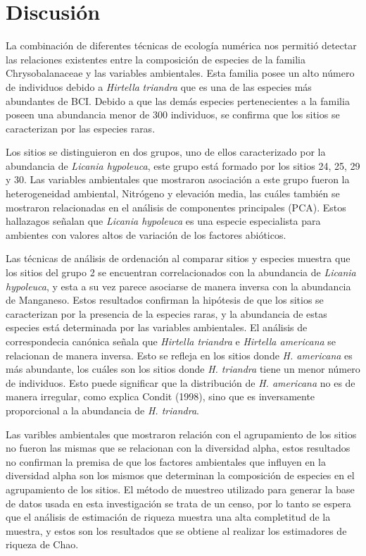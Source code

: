 \documentclass[11pt,]{article}
\begin{document}
\section{Discusión}\label{discusiuxf3n}

La combinación de diferentes técnicas de ecología numérica nos permitió
detectar las relaciones existentes entre la composición de especies de
la familia Chrysobalanaceae y las variables ambientales. Esta familia
posee un alto número de individuos debido a \emph{Hirtella}
\emph{triandra} que es una de las especies más abundantes de BCI. Debido
a que las demás especies pertenecientes a la familia poseen una
abundancia menor de 300 individuos, se confirma que los sitios se
caracterizan por las especies raras.

Los sitios se distinguieron en dos grupos, uno de ellos caracterizado
por la abundancia de \emph{Licania hypoleuca}, este grupo está formado
por los sitios 24, 25, 29 y 30. Las variables ambientales que mostraron
asociación a este grupo fueron la heterogeneidad ambiental, Nitrógeno y
elevación media, las cuáles también se mostraron relacionadas en el
análisis de componentes principales (PCA). Estos hallazagos señalan que
\emph{Licania hypoleuca} es una especie especialista para ambientes con
valores altos de variación de los factores abióticos.

Las técnicas de análisis de ordenación al comparar sitios y especies
muestra que los sitios del grupo 2 se encuentran correlacionados con la
abundancia de \emph{Licania hypoleuca}, y esta a su vez parece asociarse
de manera inversa con la abundancia de Manganeso. Estos resultados
confirman la hipótesis de que los sitios se caracterizan por la
presencia de la especies raras, y la abundancia de estas especies está
determinada por las variables ambientales. El análisis de correspondecia
canónica señala que \emph{Hirtella triandra} e \emph{Hirtella americana}
se relacionan de manera inversa. Esto se refleja en los sitios donde
\emph{H. americana} es más abundante, los cuáles son los sitios donde
\emph{H. triandra} tiene un menor número de individuos. Esto puede
significar que la distribución de \emph{H. americana} no es de manera
irregular, como explica Condit (1998), sino que es inversamente
proporcional a la abundancia de \emph{H. triandra}.

Las varibles ambientales que mostraron relación con el agrupamiento de
los sitios no fueron las mismas que se relacionan con la diversidad
alpha, estos resultados no confirman la premisa de que los factores
ambientales que influyen en la diversidad alpha son los mismos que
determinan la composición de especies en el agrupamiento de los sitios.
El método de muestreo utilizado para generar la base de datos usada en
esta investigación se trata de un censo, por lo tanto se espera que el
análisis de estimación de riqueza muestra una alta completitud de la
muestra, y estos son los resultados que se obtiene al realizar los
estimadores de riqueza de Chao.
\end{document}
